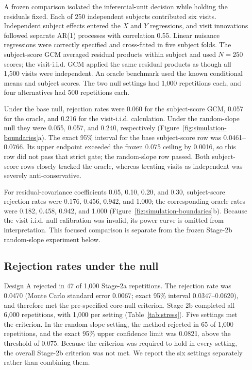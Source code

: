 \documentclass[11pt]{article}
\theoremstyle{definition}
\begin{document}
A frozen comparison isolated the inferential-unit decision while holding the residuals
fixed. Each of 250 independent subjects contributed six visits. Independent subject effects
entered the $X$ and $Y$ regressions, and visit innovations followed separate AR(1) processes
with correlation 0.55. Linear nuisance regressions were correctly specified and cross-fitted
in five subject folds. The subject-score GCM averaged residual products within subject and
used $N=250$ scores; the visit-i.i.d. GCM applied the same residual products as though all
1,500 visits were independent. An oracle benchmark used the known conditional means and
subject scores. The two null settings had 1,000 repetitions each, and four alternatives had
500 repetitions each.

Under the base null, rejection rates were 0.060 for the subject-score GCM, 0.057 for the
oracle, and 0.216 for the visit-i.i.d. calculation. Under the random-slope null they were
0.055, 0.057, and 0.240, respectively (Figure~\ref{fig:simulation-boundaries}a). The exact
95\% interval for the base subject-score row was 0.0461--0.0766. Its upper endpoint exceeded
the frozen 0.075 ceiling by 0.0016, so this row did not pass that strict gate; the
random-slope row passed. Both subject-score rows closely tracked the oracle, whereas treating
visits as independent was severely anti-conservative.

For residual-covariance coefficients 0.05, 0.10, 0.20, and 0.30, subject-score rejection
rates were 0.176, 0.456, 0.942, and 1.000; the corresponding oracle rates were 0.182, 0.458,
0.942, and 1.000 (Figure~\ref{fig:simulation-boundaries}b). Because the visit-i.i.d. null
calibration was invalid, its power curve is omitted from interpretation. This focused comparison
is separate from the frozen Stage-2b random-slope experiment below.

\subsection{Rejection rates under the null}

Design A rejected in 47 of 1,000 Stage-2a repetitions. The rejection rate was 0.0470
(Monte Carlo standard error 0.0067; exact 95\% interval 0.0347--0.0620), and therefore met
the pre-specified core-null criterion. Stage 2b completed all 6,000 repetitions, with 1,000
per setting (Table~\ref{tab:stress}). Five settings met the criterion. In the random-slope
setting, the method rejected in 65 of 1,000 repetitions, and the exact 95\% upper confidence
limit was 0.0821, above the threshold of 0.075. Because the criterion was required to hold
in every setting, the overall Stage-2b criterion was not met. We report the six settings
separately rather than combining them.
\end{document}
